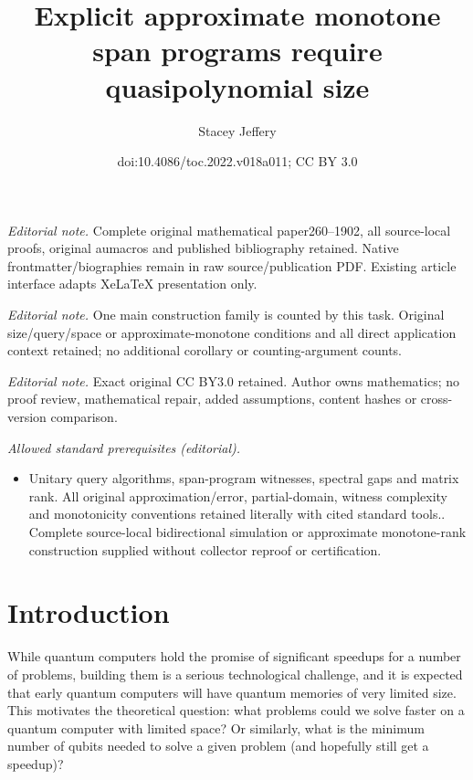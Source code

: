 \documentclass[11pt]{article}
\title{Explicit approximate monotone span programs require quasipolynomial size}
\author{Stacey Jeffery}
\date{doi:10.4086/toc.2022.v018a011; CC BY 3.0}
\numberwithin{equation}{section}
\theoremstyle{definition}
\theoremstyle{plain}
\begin{document}
\maketitle
\noindent\textit{Editorial note.} Complete original mathematical paper260--1902, all source-local proofs, original aumacros and published bibliography retained. Native frontmatter/biographies remain in raw source/publication PDF. Existing article interface adapts XeLaTeX presentation only.\par\medskip
\noindent\textit{Editorial note.} One main construction family is counted by this task. Original size/query/space or approximate-monotone conditions and all direct application context retained; no additional corollary or counting-argument counts.\par\medskip
\noindent\textit{Editorial note.} Exact original CC BY3.0 retained. Author owns mathematics; no proof review, mathematical repair, added assumptions, content hashes or cross-version comparison.\par\medskip
\noindent\textit{Allowed standard prerequisites (editorial).}\begin{itemize}
\item Unitary query algorithms, span-program witnesses, spectral gaps and matrix rank. All original approximation/error, partial-domain, witness complexity and monotonicity conventions retained literally with cited standard tools.. Complete source-local bidirectional simulation or approximate monotone-rank construction supplied without collector reproof or certification.
\end{itemize}\medskip
\section{Introduction}

While quantum computers hold the promise of significant speedups for a number of problems, building them is a serious technological challenge, and it is expected that early quantum computers will have quantum memories of very limited size. This motivates the theoretical question: what problems could we solve faster on a quantum computer with limited space? Or similarly, what is the minimum number of qubits needed to solve a given problem (and hopefully still get a speedup)?  %
\end{document}
